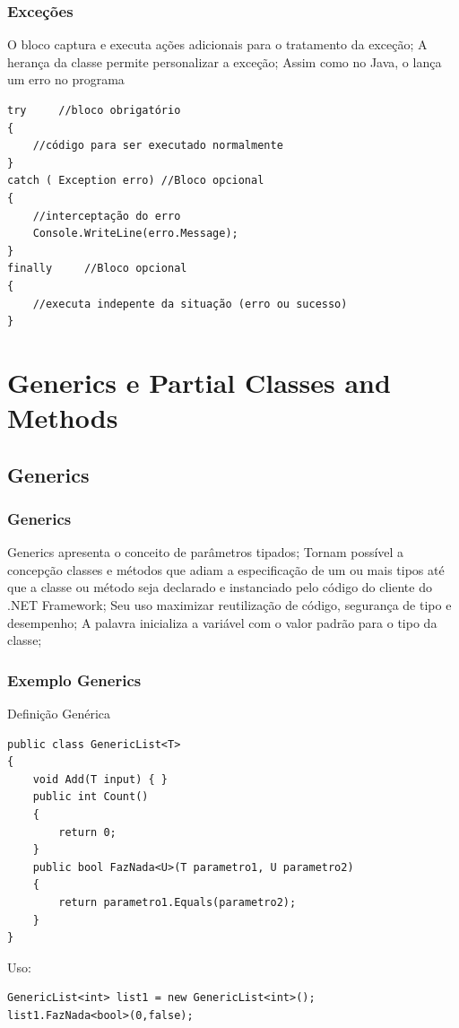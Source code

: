 \documentclass{beamer}
\begin{document}
\begin{frame}[fragile]
\frametitle{Exceções}
\begin{outline}
	\1 O bloco  captura e executa ações adicionais para o tratamento da exceção;
	\1 A herança da classe  permite personalizar a exceção;
	\1 Assim como no Java, o  lança um erro no programa
\1 []
\begin{lstlisting}
try 	//bloco obrigatório
{
	//código para ser executado normalmente
}
catch ( Exception erro) //Bloco opcional
{
	//interceptação do erro
	Console.WriteLine(erro.Message);
}
finally 	//Bloco opcional
{
	//executa indepente da situação (erro ou sucesso)
}
\end{lstlisting}
\end{outline}
\end{frame}

\section{Generics e Partial Classes and Methods}
\subsection{Generics}

\begin{frame}
\frametitle{Generics}
\begin{outline}
	\1 Generics apresenta o conceito de parâmetros tipados;
	\1 Tornam possível a concepção classes e métodos que adiam a especificação de um ou mais tipos até que a classe ou método seja declarado e instanciado pelo código do cliente do .NET Framework;
	\1 Seu uso maximizar reutilização de código, segurança de tipo e desempenho;
	\1 A palavra  inicializa a variável com o valor padrão para o tipo da classe;	
\end{outline}
\end{frame}


\begin{frame}[fragile]
\frametitle{Exemplo Generics}
\begin{outline}
\1 Definição Genérica
\1 [] 
\begin{lstlisting}
public class GenericList<T>
{
	void Add(T input) { }
	public int Count()
	{
		return 0;
	}
	public bool FazNada<U>(T parametro1, U parametro2)
	{
		return parametro1.Equals(parametro2);
	}
}
\end{lstlisting}
\1 Uso:
\1 []
\begin{lstlisting}
GenericList<int> list1 = new GenericList<int>();
list1.FazNada<bool>(0,false);
\end{lstlisting}
\end{outline}
\end{frame}
\end{document}
